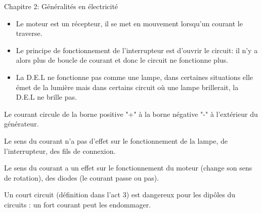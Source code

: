 \documentclass[24pt]{article}
\newcommand{\titre}{Chapitre 2: Généralités en électricité} %
\begin{document}
\thispagestyle{fancy}
\cfoot{}

\begin{titlebox}{\titre}
    \setlength\parindent{4pt} %
    \setlength\parskip{5pt} 

    \begin{itemize}
        \item Le moteur est un récepteur, il se met en mouvement lorsqu'un courant le traverse.
        \item Le principe de fonctionnement de 
        l'interrupteur est d'ouvrir le circuit: il n'y a alors plus de 
        boucle de courant et donc le circuit ne fonctionne plus.
        \item La D.E.L ne fonctionne pas comme une lampe, dans certaines situations 
        elle émet de la lumière mais dans certains circuit où une lampe brillerait, la D.E.L ne brille pas. 
    \end{itemize}
    
    
    \vspace{50pt}
    Le courant circule de la borne positive "+" 
    à la borne négative "-" à l'extérieur du générateur.

    Le sens du courant n'a pas d'effet sur le 
    fonctionnement de la lampe, de l'interrupteur, des fils de connexion.
    
    Le sens du courant a un effet sur le fonctionnement du moteur 
    (change son sens de rotation), des diodes (le
    courant passe ou pas).

    \begin{multicols}{2}
    [
    ]
    \hspace{-17pt}
    \begin{minipage}[t]{0.3\textwidth}
    \end{minipage}

    \begin{minipage}[t]{0.3\textwidth}
    \end{minipage}
    \end{multicols}
    
    \vspace{50pt}
    Un court circuit (définition dans l'act 3) est dangereux
    pour les dipôles du circuits : un fort courant peut les endommager.
    

\end{titlebox}
\end{document}
